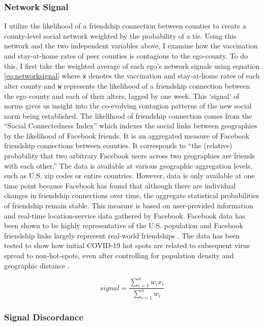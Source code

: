 \hypertarget{network-signal}{\subsubsection{Network Signal}\label{network-signal}}

I utilize the likelihood of a friendship connection between counties to create a
county-level social network weighted by the probability of a tie. Using this
network and the two independent variables above, I examine how the vaccination
and stay-at-home rates of peer counties is contagious to the ego-county. To do
this, I first take the weighted average of each ego's network signals using
equation \eqref{eq:networksignal} where \texttt{x} denotes the vaccination and
stay-at-home rates of each alter county and \texttt{w} represents the likelihood
of a friendship connection between the ego county and each of their alters,
lagged by one week. This `signal' of norms gives us insight into the co-evolving
contagion patterns of the new social norm being established. The likelihood of
friendship connection comes from the ``Social Connectedness Index''
\citep{Bailey2018, facebook20} which indexes the social links between
geographies by the likelihood of Facebook friends. It is an aggregated measure
of Facebook friendship connections between counties. It corresponds to ``the
(relative) probability that two arbitrary Facebook users across two geographies
are friends with each other.'' The data is available at various geographic
aggregation levels, such as U.S. zip codes or entire countries. However, data is
only available at one time point because Facebook has found that although there
are individual changes in friendship connections over time, the aggregate
statistical probabilities of friendship remain stable. This measure is based on
user-provided information and real-time location-service data gathered by
Facebook. Facebook data has been shown to be highly representative of the U.S.
population and Facebook friendship links largely represent real-world
friendships \citep{bailey_etal18, jones_etal13}. The data has been tested to
show how initial COVID-19 hot spots are related to subsequent virus spread to
non-hot-spots, even after controlling for population density and geographic
distance \citep{Kuchler2020}.

\begin{equation}
signal = \frac{\sum_{i=1}^nw_ix_i}{\sum^n_{i=1}w_i} \label{eq:networksignal}
\end{equation}

\hypertarget{signal-discordance}{\subsubsection{Signal Discordance}\label{signal-discordance}}

